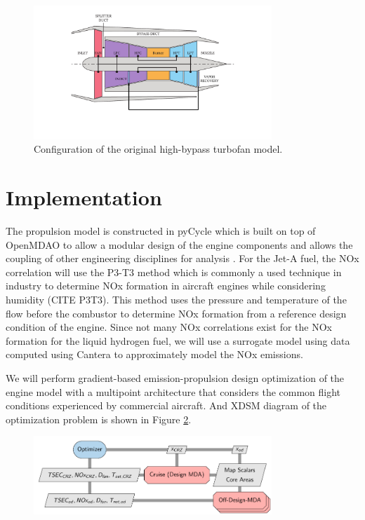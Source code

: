 \documentclass[]{icas2022}
\begin{document}
\begin{figure}[H]
	\centering
	\includegraphics[width=0.8\textwidth]{turbofan_wvr.pdf}
	\caption{Configuration of the original high-bypass turbofan model.}
	\label{fig:hbtf_cycle}
\end{figure}




\section{Implementation}
\label{sec:imp}
The propulsion model is constructed in pyCycle which is built on top of OpenMDAO to allow a modular design of the engine components and allows the coupling of other engineering disciplines for analysis \cite{openmdao_2019}. 
For the Jet-A fuel, the NOx correlation will use the P3-T3 method which is commonly a used technique in industry to determine NOx formation in aircraft engines while considering humidity (CITE P3T3). 
This method uses the pressure and temperature of the flow before the combustor to determine NOx formation from a reference design condition of the engine. 
Since not many NOx correlations exist for the NOx formation for the liquid hydrogen fuel, we will use a surrogate model using data computed using Cantera to approximately model the NOx emissions.

We will perform gradient-based emission-propulsion design optimization of the engine model with a multipoint architecture that considers the common flight conditions experienced by commercial aircraft. And XDSM diagram of the optimization problem is shown in Figure \ref{fig:opt_prob}.

\begin{figure}[H]
	\centering
	\includegraphics[width=0.8\textwidth]{N3_inject.pdf}
	\caption{}
	\label{fig:opt_prob}
\end{figure}
\end{document}
